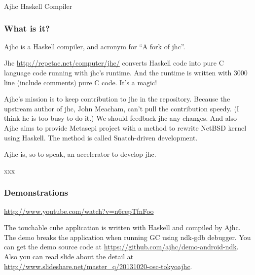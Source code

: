 \documentclass[DIV16,twocolumn,10pt]{scrreprt}
\begin{document}
\begin{hcarentry}{Ajhc Haskell Compiler}
\makeheader

\newcommand{\WhatsIsIt}{\subsubsection*{What is it?}}
\newcommand{\Usage}{\subsubsection*{Usage}}
\newcommand{\License}{\subsubsection*{License}}
\newcommand{\Demo}{\subsubsection*{Demonstrations}}

\WhatsIsIt

Ajhc is a Haskell compiler, and acronym for ``A fork of jhc''.

Jhc \url{http://repetae.net/computer/jhc/} converts Haskell code into pure C language code running with jhc's runtime. And the runtime is written with 3000 line (include comments) pure C code. It's a magic!

Ajhc's mission is to keep contribution to jhc in the repository. Because the upstream author of jhc, John Meacham, can't pull the contribution speedy. (I think he is too busy to do it.) We should feedback jhc any changes. And also Ajhc aims to provide Metasepi project with a method to rewrite NetBSD kernel using Haskell. The method is called Snatch-driven development.

Ajhc is, so to speak, an accelerator to develop jhc.

\WhatsNew

xxx

\Demo

\noindent \url{http://www.youtube.com/watch?v=n6cepTfnFoo}

The touchable cube application is written with Haskell and compiled by Ajhc. The demo breaks the application when running GC using ndk-gdb debugger. You can get the demo source code at \url{https://github.com/ajhc/demo-android-ndk}. Also you can read slide about the detail at \url{http://www.slideshare.net/master\_q/20131020-osc-tokyoajhc}.


\end{hcarentry}
\end{document}
